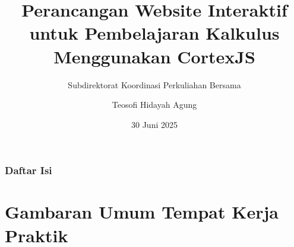 \documentclass[aspectratio=169,t,xcolor=table]{beamer}
\begin{document}
\title[Website Kalkulus]{Perancangan Website Interaktif untuk Pembelajaran Kalkulus Menggunakan CortexJS}
\subtitle{Subdirektorat Koordinasi Perkuliahan Bersama}

\author{Teosofi Hidayah Agung}

\date{30 Juni 2025}
\frame[noframenumbering]{\titlepage}



\begin{frame}
    \frametitle{Daftar Isi}
    \tableofcontents
\end{frame}
\section{Gambaran Umum Tempat Kerja Praktik}

\end{document}
